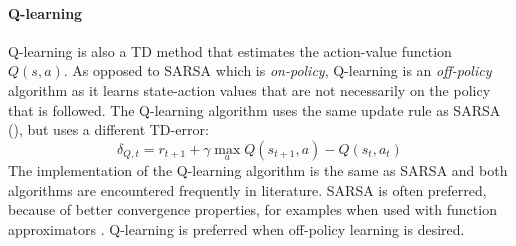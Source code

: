 \paragraph{Q-learning}\label{sec:RL-Q_learning}
Q-learning \cite{WatkinsDayan:92} is also a \ac{TD} method that estimates the action-value function $Q(s,a)$. As opposed to SARSA which is \emph{on-policy}, Q-learning is an \emph{off-policy} algorithm as it learns state-action values that are not necessarily on the policy that is followed. The Q-learning algorithm uses the same update rule as SARSA (), but uses a different TD-error:
$$%
	\delta_{Q,t} = r_{t+1} + \gamma\max_a Q(s_{t+1},a)-Q(s_t,a_t)
$$%
The implementation of the Q-learning algorithm is the same as SARSA and both algorithms are encountered frequently in literature. SARSA is often preferred, because of better convergence properties, for examples when used with function approximators \cite{Gordon:95}. Q-learning is preferred when off-policy learning is desired.






